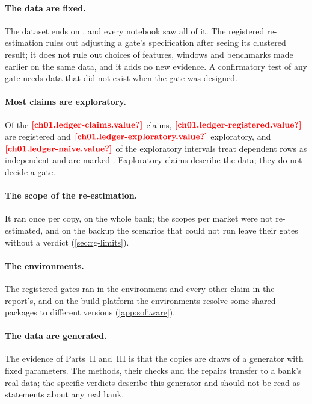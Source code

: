 \paragraph{The data are fixed.} The dataset ends on , and every notebook saw all of it. The
registered re-estimation rules out adjusting a gate's specification after seeing its clustered result; it does not rule
out choices of features, windows and benchmarks made earlier on the same data, and it adds no new evidence. A confirmatory
test of any gate needs data that did not exist when the gate was designed.

\paragraph{Most claims are exploratory.} Of the $\est{ch01.ledger-claims}{value}$ claims, $\est{ch01.ledger-registered}{value}$
are registered and $\est{ch01.ledger-exploratory}{value}$ exploratory, and $\est{ch01.ledger-naive}{value}$ of the
exploratory intervals treat dependent rows as independent and are marked \naivemark{}. Exploratory claims describe the
data; they do not decide a gate.

\paragraph{The scope of the re-estimation.} It ran once per copy, on the whole bank; the scopes per market were not
re-estimated, and on the backup the scenarios that could not run leave their gates without a verdict
(\cref{sec:rg-limits}).

\paragraph{The environments.} The registered gates ran in the  environment and every other claim in the
report's, and on the build platform the environments resolve some shared packages to different versions
(\cref{app:software}).

\paragraph{The data are generated.} The evidence of Parts~II and~III is that the copies are draws of a generator with
fixed parameters. The methods, their checks and the repairs transfer to a bank's real data; the specific verdicts
describe this generator and should not be read as statements about any real bank.

